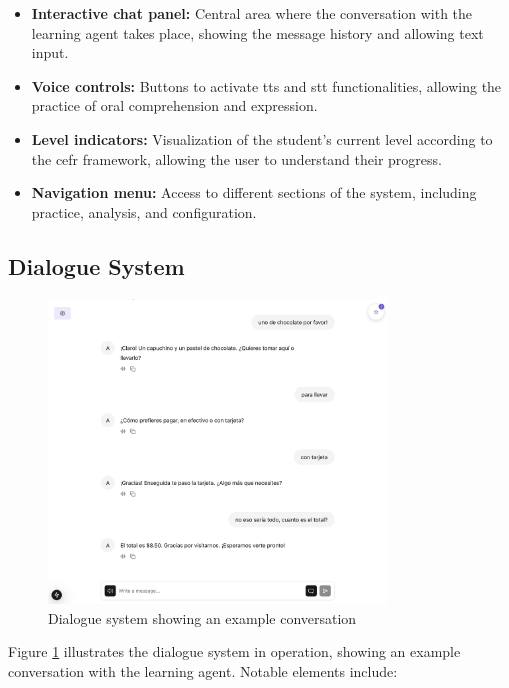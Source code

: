 \begin{itemize}
    \item \textbf{Interactive chat panel:} Central area where the conversation with the learning agent takes place, showing the message history and allowing text input.
    
    \item \textbf{Voice controls:} Buttons to activate \gls{tts} and \gls{stt} functionalities, allowing the practice of oral comprehension and expression.
    
    \item \textbf{Level indicators:} Visualization of the student's current level according to the \gls{cefr} framework, allowing the user to understand their progress.
    
    \item \textbf{Navigation menu:} Access to different sections of the system, including practice, analysis, and configuration.
\end{itemize}

\subsection{Dialogue System}
\label{subsec:sistema-dialogo}

\begin{figure}[H]
    \centering
    \includegraphics[width=0.8\textwidth]{figuras/screenshots/chat-complete.png}
    \caption{Dialogue system showing an example conversation}
    \label{fig:dialog-system}
\end{figure}

Figure \ref{fig:dialog-system} illustrates the dialogue system in operation, showing an example conversation with the learning agent. Notable elements include:

